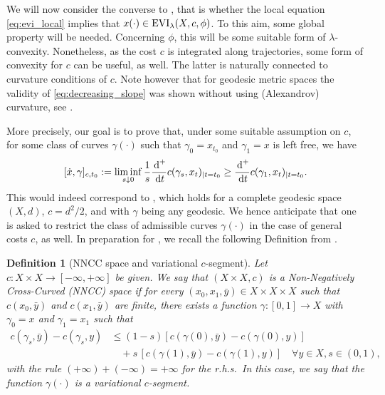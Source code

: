 \documentclass[reqno]{amsart}
\newcounter{results}[section]
\theoremstyle{plain}
\theoremstyle{remark}
\theoremstyle{plain}
\newtheorem{definition}[results]{Definition}
\numberwithin{equation}{section}
\theoremstyle{remark}
\newcommand{\y}{\bar y}
\newcommand{\YY}{X}
\newcommand{\de}{{\,\rm d}}
\DeclareMathOperator{\EVI}{{\rm EVI}}
\begin{document}
We will now consider the converse to , that is whether the local equation \eqref{eq:evi_local}  implies that  $x(\cdot) \in  \EVI_\lambda(X,c,\phi)$.  To this aim, some global property will be needed.  
 Concerning  $\phi$,  this will be some suitable form of $\lambda$-convexity.  Nonetheless, as the cost $c$ is integrated along trajectories, some form of convexity for $c$ can be useful, as well. The latter is naturally connected to curvature conditions of $c$.  Note however that for geodesic metric spaces the validity of \eqref{eq:decreasing_slope} was shown without using (Alexandrov) curvature, see \cite[Lemma 3.13]{MuratoriSavare}.    


More precisely, our goal is to prove that, under some  suitable assumption  on $c$, for some class of curves $\gamma(\cdot)$ such that $\gamma_{ 0 }=x_{t_0}$ and $\gamma_{ 1 }=x$ is left free, we have 
\begin{equation}\label{eq:decreasing_slope}
    [\dot x, \gamma]_{c,t_0}:= \liminf_{s\downarrow 0} \frac{1}{s} \frac{\de^+}{\de t} c(\gamma_s, x_t)_{|t=t_0} \ge \frac{\de^+}{\de t} c(\gamma_{ 1}, x_t)_{|t=t_0}.
\end{equation}
This  would indeed correspond  to \cite[eq.~(3.56), Lemma 3.13]{MuratoriSavare}, which holds for  a complete geodesic space  $(X,d)$, $c={d^2}/{2}$, and with $\gamma$  being  any geodesic.  We hence anticipate that one  is   asked to restrict the class of admissible curves $\gamma(\cdot)$ in the case of general costs $c$, as well.  In preparation for , we recall the following Definition from \cite[Definitions 2.6, 2.7]{leger2024nonnegative}.  

\begin{definition}[NNCC space and variational $c$-segment]\label{def:nncc}
    Let 
    $c\colon X\times \YY\to [-\infty,+\infty]$  be given.  We say that $(X\times \YY,c)$ is a \emph{Non-Negatively Cross-Curved (NNCC)  space} if for every $(x_0,x_1,\y)\in X\times X\times \YY$ such that $c(x_0,\y)$ and $c(x_1,\y)$ are finite, there exists a function  $\gamma:[0,1] \to X $ with $\gamma_0=x$ and $\gamma_1=x_1$  such that 
    \begin{align}  
    c(\gamma_s,\y)-c(\gamma_s,y)&\leq (1-s)[c(\gamma(0),\y)-c(\gamma(0),y)] \nonumber \\
     & \quad + s \,[c(\gamma(1),\y)-c(\gamma(1),y)]
     \quad \forall y \in \YY, s \in (0,1),\label{eq:NNCC-ineq}
    \end{align}
    with the rule $(+\infty)+(-\infty)=+\infty$  for  the r.h.s.\  In this case, we say that the function $\gamma(\cdot)$ is a 
    \emph{variational $c$-segment}. 
\end{definition}
\end{document}
